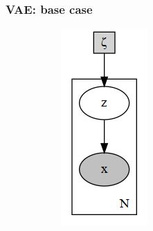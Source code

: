 \documentclass[final]{beamer}
\begin{document}
\begin{frame}
\frametitle{VAE: base case}

\begin{figure}[h]
\centering
\begin{subfigure}[b]{0.2\textwidth}
\includegraphics[width=\textwidth]{plots/vae_p.gv.png}

\end{subfigure}
\end{figure}
\end{frame}
\end{document}
